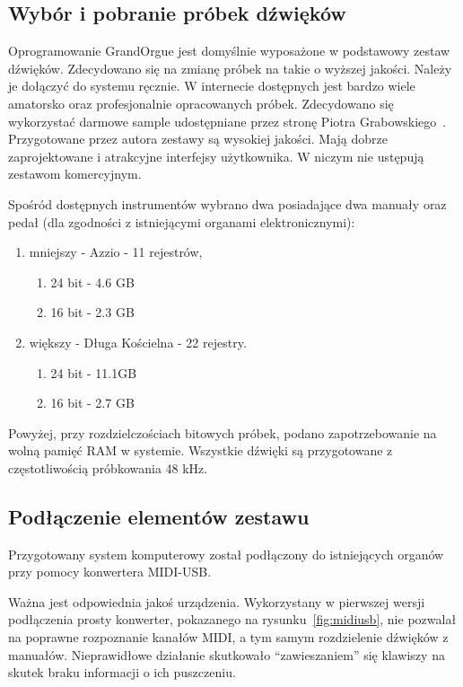 \documentclass[11pt]{report}
\begin{document}
    \subsection{Wybór i pobranie próbek dźwięków}
    Oprogramowanie GrandOrgue jest domyślnie wyposażone w podstawowy zestaw dźwięków.
    Zdecydowano się na zmianę próbek na takie o wyższej jakości.
    Należy je dołączyć do systemu ręcznie.
    W internecie dostępnych jest bardzo wiele amatorsko oraz profesjonalnie opracowanych próbek.
    Zdecydowano się wykorzystać darmowe sample udostępniane przez stronę Piotra Grabowskiego~\cite{grabowski}.
    Przygotowane przez autora zestawy są wysokiej jakości.
    Mają dobrze zaprojektowane i atrakcyjne interfejsy użytkownika.
    W niczym nie ustępują zestawom komercyjnym.

    Spośród dostępnych instrumentów wybrano dwa posiadające dwa manuały oraz pedał (dla zgodności z istniejącymi organami elektronicznymi):
    \begin{enumerate}
        \item mniejszy - Azzio - 11 rejestrów,
        \begin{enumerate}
            \item 24 bit - 4.6 GB
            \item 16 bit - 2.3 GB
        \end{enumerate}
        \item większy - Długa Kościelna - 22 rejestry.
        \begin{enumerate}
            \item 24 bit - 11.1GB
            \item 16 bit - 2.7 GB
        \end{enumerate}
    \end{enumerate}
    Powyżej, przy rozdzielczościach bitowych próbek, podano zapotrzebowanie na wolną pamięć RAM w systemie.
    Wszystkie dźwięki są przygotowane z częstotliwością próbkowania 48 kHz.

    \subsection{Podłączenie elementów zestawu}
    Przygotowany system komputerowy został podłączony do istniejących organów przy pomocy konwertera MIDI-USB.

    Ważna jest odpowiednia jakoś urządzenia.
    Wykorzystany w pierwszej wersji podłączenia prosty konwerter, pokazanego na rysunku~\ref{fig:midiusb}, nie pozwalał na poprawne rozpoznanie kanałów MIDI, a tym samym rozdzielenie dźwięków z manuałów.
    Nieprawidłowe działanie skutkowało ``zawieszaniem'' się klawiszy na skutek braku informacji o ich puszczeniu.
\end{document}
